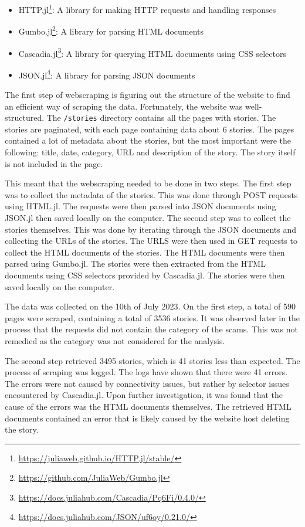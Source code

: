 \begin{itemize}
    \item HTTP.jl\footnote[0]{\url{https://juliaweb.github.io/HTTP.jl/stable/}}: A library for making HTTP requests and handling responses 
    \item Gumbo.jl\footnote[1]{\url{https://github.com/JuliaWeb/Gumbo.jl}}: A library for parsing HTML documents
    \item Cascadia.jl\footnote[2]{\url{https://docs.juliahub.com/Cascadia/Pq6Fi/0.4.0/}}: A library for querying HTML documents using CSS selectors
    \item JSON.jl\footnote[3]{\url{https://docs.juliahub.com/JSON/uf6oy/0.21.0/}}: A library for parsing JSON documents
\end{itemize}

The first step of webscraping is figuring out the structure of the website to find an efficient way of scraping the data. Fortunately, the website was well-structured. The \texttt{/stories} directory contains all the pages with stories. The stories are paginated, with each page containing data about 6 stories. The pages contained a lot of metadata about the stories, but the most important were the following: title, date, category, URL and description of the story. The story itself is not included in the page. 

This meant that the webscraping needed to be done in two steps. The first step was to collect the metadata of the stories. This was done through POST requests using HTML.jl. The requests were then parsed into JSON documents using JSON.jl then saved locally on the computer. The second step was to collect the stories themselves. This was done by iterating through the JSON documents and collecting the URLs of the stories. The URLS were then used in GET requests to collect the HTML documents of the stories. The HTML documents were then parsed using Gumbo.jl. The stories were then extracted from the HTML documents using CSS selectors provided by Cascadia.jl. The stories were then saved locally on the computer.

The data was collected on the 10th of July 2023. On the first step, a total of 590 pages were scraped, containing a total of 3536 stories. It was observed later in the process that the requests did not contain the category of the scams. This was not remedied as the category was not considered for the analysis.

The second step retrieved 3495 stories, which is 41 stories less than expected. The process of scraping was logged. The logs have shown that there were 41 errors. The errors were not caused by connectivity issues, but rather by selector issues encountered by Cascadia.jl. Upon further investigation, it was found that the cause of the errors was the HTML documents themselves. The retrieved HTML documents contained an error that is likely caused by the website host deleting the story.

